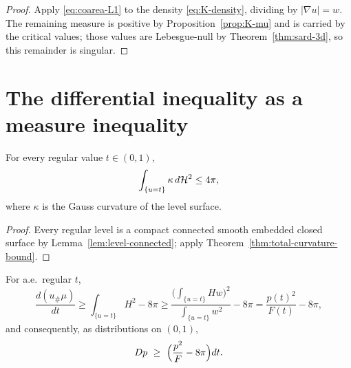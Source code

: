 \begin{proof}
Apply \eqref{eq:coarea-L1} to the density \eqref{eq:K-density}, dividing by
$|\nabla u|=w$.  The remaining measure is positive by
Proposition~\ref{prop:K-mu} and is carried by the critical values; those values
are Lebesgue-null by Theorem~\ref{thm:sard-3d}, so this remainder is singular.
\end{proof}

\section{The differential inequality as a measure inequality}

\begin{lemma}\label{lem:K-gauss-bonnet-input}
For every regular value $t\in(0,1)$,
\begin{equation}\label{eq:K-gauss-bonnet-input}
  \int_{\{u=t\}}\kappa\,d\mathcal H^2\le4\pi ,
\end{equation}
where $\kappa$ is the Gauss curvature of the level surface.
\end{lemma}

\begin{proof}
Every regular level is a compact connected smooth embedded closed surface by
Lemma~\ref{lem:level-connected}; apply
Theorem~\ref{thm:total-curvature-bound}.
\end{proof}

\begin{proposition}\label{prop:K-measure-inequality}
For a.e.\ regular $t$,
\begin{equation}\label{eq:K-measure-ineq-pointwise}
  \frac{d(u_\#\mu)}{dt}
  \ge\int_{\{u=t\}}H^2-8\pi
  \ge\frac{\bigl(\int_{\{u=t\}}Hw\bigr)^2}{\int_{\{u=t\}}w^2}-8\pi
  =\frac{p(t)^2}{F(t)}-8\pi ,
\end{equation}
and consequently, as distributions on $(0,1)$,
\begin{equation}\label{eq:K-measure-ineq}
  Dp\ \ge\ \Bigl(\frac{p^2}{F}-8\pi\Bigr)dt .
\end{equation}
\end{proposition}

